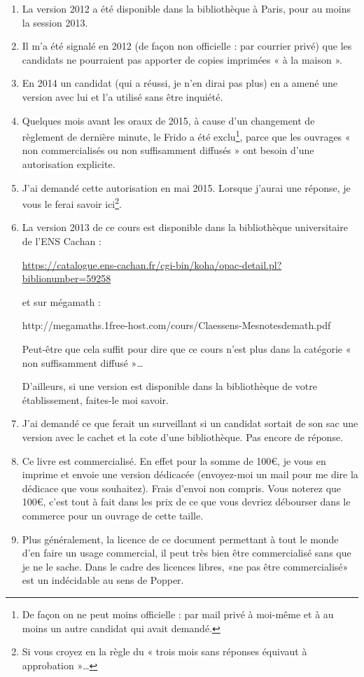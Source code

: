 \begin{enumerate}
    \item
        La version 2012 a été disponible dans la bibliothèque à Paris, pour au moins la session 2013.
    \item 
        Il m'a été signalé en 2012 (de façon non officielle : par courrier privé) que les candidats ne pourraient pas apporter de copies imprimées « à la maison ».
    \item
        En 2014 un candidat (qui a réussi, je n'en dirai pas plus) en a amené une version avec lui et l'a utilisé sans être inquiété.
    \item
        Quelques mois avant les oraux de 2015, à cause d'un changement de règlement de dernière minute, le Frido a été exclu\footnote{De façon on ne peut moins officielle : par mail privé à moi-même et à au moins un autre candidat qui avait demandé.}, parce que les ouvrages « non commercialisés ou non suffisamment diffusés » ont besoin d'une autorisation explicite.
    \item
        J'ai demandé cette autorisation en mai 2015. Lorsque j'aurai une réponse, je vous le ferai savoir ici\footnote{Si vous croyez en la règle du « trois mois sans réponses équivaut à approbation »\ldots}.
    \item
        La version 2013 de ce cours est disponible dans la bibliothèque universitaire de l'ENS Cachan :
        \begin{center}
            \url{https://catalogue.ens-cachan.fr/cgi-bin/koha/opac-detail.pl?biblionumber=59258}
        \end{center}
        et sur mégamath :
        \begin{center}
            http://megamaths.1free-host.com/cours/Claessens-Mesnotesdemath.pdf
        \end{center}
        Peut-être que cela suffit pour dire que ce cours n'est plus dans la catégorie « non suffisamment diffusé »\ldots

        D'ailleurs, si une version est disponible dans la bibliothèque de votre établissement, faites-le moi savoir.
    \item
        J'ai demandé ce que ferait un surveillant si un candidat sortait de son sac une version avec le cachet et la cote d'une bibliothèque. Pas encore de réponse.
    \item
        Ce livre est commercialisé. En effet pour la somme de 100€, je vous en imprime et envoie une version dédicacée (envoyez-moi un mail pour me dire la dédicace que vous souhaitez). Frais d'envoi non compris. Vous noterez que 100€, c'est tout à fait dans les prix de ce que vous devriez débourser dans le commerce pour un ouvrage de cette taille.
    \item
        Plus généralement, la licence de ce document permettant à tout le monde d'en faire un usage commercial, il peut très bien être commercialisé sans que je ne le sache. Dans le cadre des licences libres, «ne pas être commercialisé» est un indécidable au sens de Popper.
\end{enumerate}


